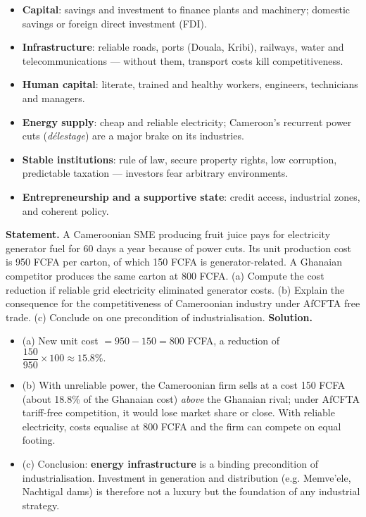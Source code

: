 \documentclass[11pt]{article}
\begin{document}
\begin{aretenir}
\begin{itemize}
\item \textbf{Capital}: savings and investment to finance plants and machinery; domestic savings or foreign direct investment (FDI).
\item \textbf{Infrastructure}: reliable roads, ports (Douala, Kribi), railways, water and telecommunications — without them, transport costs kill competitiveness.
\item \textbf{Human capital}: literate, trained and healthy workers, engineers, technicians and managers.
\item \textbf{Energy supply}: cheap and reliable electricity; Cameroon's recurrent power cuts (\emph{délestage}) are a major brake on its industries.
\item \textbf{Stable institutions}: rule of law, secure property rights, low corruption, predictable taxation — investors fear arbitrary environments.
\item \textbf{Entrepreneurship and a supportive state}: credit access, industrial zones, and coherent policy.
\end{itemize}
\end{aretenir}

\begin{exoresolu}
\textbf{Statement.} A Cameroonian SME producing fruit juice pays for electricity generator fuel for 60 days a year because of power cuts. Its unit production cost is 950 FCFA per carton, of which 150 FCFA is generator-related. A Ghanaian competitor produces the same carton at 800 FCFA. (a) Compute the cost reduction if reliable grid electricity eliminated generator costs. (b) Explain the consequence for the competitiveness of Cameroonian industry under AfCFTA free trade. (c) Conclude on one precondition of industrialisation.
\tcblower
\textbf{Solution.}
\begin{itemize}
\item (a) New unit cost $= 950 - 150 = 800$ FCFA, a reduction of $\dfrac{150}{950}\times 100 \approx 15.8\%$.
\item (b) With unreliable power, the Cameroonian firm sells at a cost 150 FCFA (about 18.8\% of the Ghanaian cost) \emph{above} the Ghanaian rival; under AfCFTA tariff-free competition, it would lose market share or close. With reliable electricity, costs equalise at 800 FCFA and the firm can compete on equal footing.
\item (c) Conclusion: \textbf{energy infrastructure} is a binding precondition of industrialisation. Investment in generation and distribution (e.g. Memve'ele, Nachtigal dams) is therefore not a luxury but the foundation of any industrial strategy.
\end{itemize}
\end{exoresolu}
\end{document}
